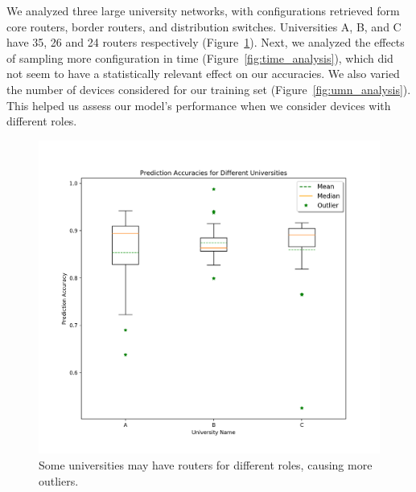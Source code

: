 We analyzed three large university networks, with configurations retrieved form core routers, border routers, and distribution switches. Universities A, B, and C have 35, 26 and 24 routers respectively
(Figure~\ref{fig:uni_analysis}). Next, we analyzed the effects of sampling more configuration in time (Figure~\ref{fig:time_analysis}), which did not seem to have a statistically relevant effect on our accuracies. We also varied the number of devices considered for our training set (Figure~\ref{fig:umn_analysis}). This helped us assess our model's performance when we consider devices with different roles.\\

\begin{figure}
	\centering
	\includegraphics[width=\columnwidth]{uni_analysis.png}
	\caption{Some universities may have routers for different roles, causing more outliers.}
    \label{fig:uni_analysis}
\end{figure}

